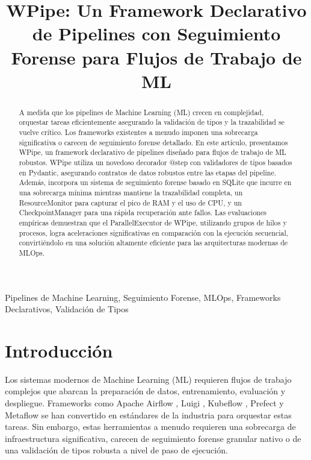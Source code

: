 \documentclass[conference]{IEEEtran}
\begin{document}
\title{WPipe: Un Framework Declarativo de Pipelines con Seguimiento Forense para Flujos de Trabajo de ML}

\author{
}

\maketitle

\begin{abstract}
A medida que los pipelines de Machine Learning (ML) crecen en complejidad, orquestar tareas eficientemente asegurando la validación de tipos y la trazabilidad se vuelve crítico. Los frameworks existentes a menudo imponen una sobrecarga significativa o carecen de seguimiento forense detallado. En este artículo, presentamos WPipe, un framework declarativo de pipelines diseñado para flujos de trabajo de ML robustos. WPipe utiliza un novedoso decorador @step con validadores de tipos basados en Pydantic, asegurando contratos de datos robustos entre las etapas del pipeline. Además, incorpora un sistema de seguimiento forense basado en SQLite que incurre en una sobrecarga mínima mientras mantiene la trazabilidad completa, un ResourceMonitor para capturar el pico de RAM y el uso de CPU, y un CheckpointManager para una rápida recuperación ante fallos. Las evaluaciones empíricas demuestran que el ParallelExecutor de WPipe, utilizando grupos de hilos y procesos, logra aceleraciones significativas en comparación con la ejecución secuencial, convirtiéndolo en una solución altamente eficiente para las arquitecturas modernas de MLOps.
\end{abstract}

\begin{IEEEkeywords}
Pipelines de Machine Learning, Seguimiento Forense, MLOps, Frameworks Declarativos, Validación de Tipos
\end{IEEEkeywords}

\section{Introducción}
Los sistemas modernos de Machine Learning (ML) requieren flujos de trabajo complejos que abarcan la preparación de datos, entrenamiento, evaluación y despliegue. Frameworks como Apache Airflow \cite{airflow}, Luigi \cite{luigi}, Kubeflow \cite{kubeflow}, Prefect \cite{prefect} y Metaflow \cite{metaflow} se han convertido en estándares de la industria para orquestar estas tareas. Sin embargo, estas herramientas a menudo requieren una sobrecarga de infraestructura significativa, carecen de seguimiento forense granular nativo o de una validación de tipos robusta a nivel de paso de ejecución.
\end{document}
